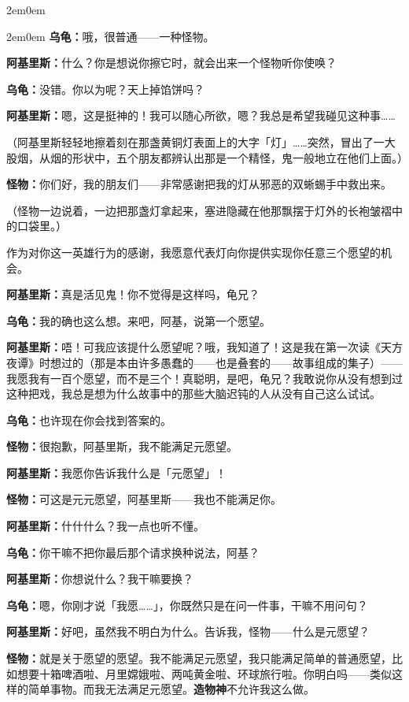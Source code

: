 \documentclass[
  12pt,
  twoside,
  openright,
  oldfontcommands,
]{memoir}
\newcommand{\heititext}[1]{{\heifamily\bfseries #1}}
\newcommand{\dialogname}[1]{{\heifamily\bfseries #1}}
\begin{document}
\begin{adjustwidth}{2em}{0em}
\begin{adjustwidth}{2em}{0em}
\dialogname{乌龟：}哦，很普通------一种怪物。

\dialogname{阿基里斯：}什么？你是想说你擦它时，就会出来一个怪物听你使唤？

\dialogname{乌龟：}没错。你以为呢？天上掉馅饼吗？

\dialogname{阿基里斯：}嗯，这是挺神的！我可以随心所欲，嗯？我总是希望我碰见这种事\ldots\ldots{}

（阿基里斯轻轻地擦着刻在那盏黄铜灯表面上的大字「灯」\ldots\ldots 突然，冒出了一大股烟，从烟的形状中，五个朋友都辨认出那是一个精怪，鬼一般地立在他们上面。）

\dialogname{怪物：}你们好，我的朋友们------非常感谢把我的灯从邪恶的双蜥蜴手中救出来。

（怪物一边说着，一边把那盏灯拿起来，塞进隐藏在他那飘摆于灯外的长袍皱褶中的口袋里。）

作为对你这一英雄行为的感谢，我愿意代表灯向你提供实现你任意三个愿望的机会。

\dialogname{阿基里斯：}真是活见鬼！你不觉得是这样吗，龟兄？

\dialogname{乌龟：}我的确也这么想。来吧，阿基，说第一个愿望。

\dialogname{阿基里斯：}唔！可我应该提什么愿望呢？哦，我知道了！这是我在第一次读《天方夜谭》时想过的（那是本由许多愚蠢的------也是叠套的------故事组成的集子）------我愿我有一百个愿望，而不是三个！真聪明，是吧，龟兄？我敢说你从没有想到过这种把戏，我总是想为什么故事中的那些大脑迟钝的人从没有自己这么试试。

\dialogname{乌龟：}也许现在你会找到答案的。

\dialogname{怪物：}很抱歉，阿基里斯，我不能满足元愿望。

\dialogname{阿基里斯：}我愿你告诉我什么是「元愿望」！

\dialogname{怪物：}可这是元元愿望，阿基里斯------我也不能满足你。

\dialogname{阿基里斯：}什什什么？我一点也听不懂。

\dialogname{乌龟：}你干嘛不把你最后那个请求换种说法，阿基？

\dialogname{阿基里斯：}你想说什么？我干嘛要换？

\dialogname{乌龟：}嗯，你刚才说「我愿\ldots\ldots」，你既然只是在问一件事，干嘛不用问句？

\dialogname{阿基里斯：}好吧，虽然我不明白为什么。告诉我，怪物------什么是元愿望？

\dialogname{怪物：}就是关于愿望的愿望。我不能满足元愿望，我只能满足简单的普通愿望，比如想要十箱啤酒啦、月里嫦娥啦、两吨黄金啦、环球旅行啦。你明白吗------类似这样的简单事物。而我无法满足元愿望。\heititext{造物神}不允许我这么做。


\end{adjustwidth}
\end{adjustwidth}
\end{document}

